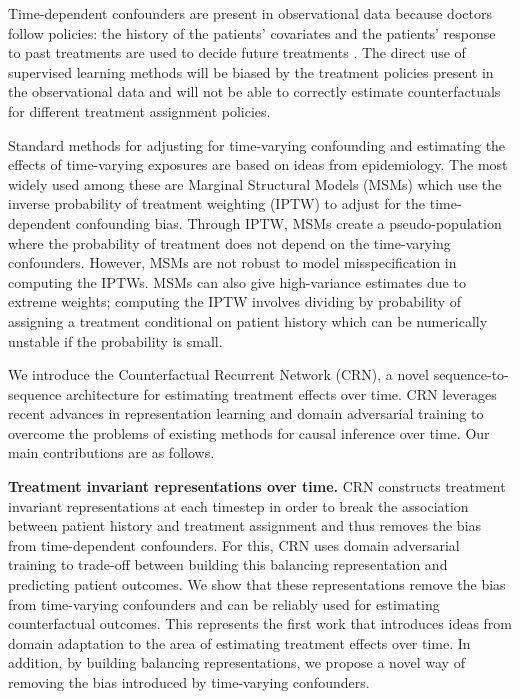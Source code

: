 \documentclass{article} %
\begin{document}
Time-dependent confounders are present in observational data because doctors follow policies: the history of the patients' covariates and the patients' response to past treatments are used to decide future treatments \citep{mansournia2012effect}. The direct use of supervised learning methods will be biased by the treatment policies present in the observational data and will not be able to correctly estimate counterfactuals for different treatment assignment policies.


Standard methods for adjusting for time-varying confounding and estimating the effects of time-varying exposures are based on ideas from epidemiology. The most widely used among these are Marginal Structural Models (MSMs) \citep{robins2000marginal, mansournia2012effect} which use the inverse probability of treatment weighting (IPTW) to adjust for the time-dependent confounding bias. Through IPTW, MSMs create a pseudo-population where the probability of treatment does not depend on the time-varying confounders. However, MSMs are not robust to model misspecification in computing the IPTWs. MSMs can also give high-variance estimates due to extreme weights; computing the IPTW involves dividing by probability of assigning a treatment conditional on patient history which can be numerically unstable if the probability is small.  
    
    
	We introduce the Counterfactual Recurrent Network (CRN), a novel sequence-to-sequence architecture for estimating treatment effects over time. CRN leverages recent advances in representation learning \citep{bengio2012representation} and domain adversarial training \citep{ganin2016domain} to overcome the problems of existing methods for causal inference over time. Our main contributions are as follows.  
	
    \textbf{Treatment invariant representations over time.} CRN constructs treatment invariant representations at each timestep in order to break the association between patient history and treatment assignment and thus removes the bias from time-dependent confounders. For this, CRN uses domain adversarial training \citep{ganin2016domain, li2018deep, sebag2019multi} to trade-off between building this balancing representation and predicting patient outcomes. We show that these representations remove the bias from time-varying confounders and can be reliably used for estimating counterfactual outcomes. This represents the first work that introduces ideas from domain adaptation to the area of estimating treatment effects over time. In addition, by building balancing representations, we propose a novel way of removing the bias introduced by time-varying confounders.  
    
\end{document}
